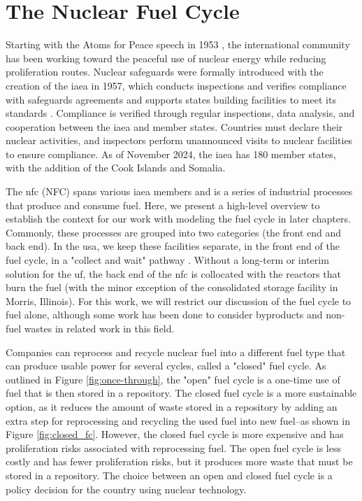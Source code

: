 \section{The Nuclear Fuel Cycle}
\label{sec:nfc}

Starting with the Atoms for Peace speech in 1953 \cite{atoms_for_peace}, the
international community has been working toward the peaceful use of nuclear
energy while reducing proliferation routes. Nuclear safeguards were formally
introduced with the creation of the \gls{iaea} in 1957, which conducts
inspections and verifies compliance with safeguards agreements and supports
states building facilities to meet its standards \cite{member_states}.
Compliance is verified through regular inspections, data analysis, and
cooperation between the \gls{iaea} and member states. Countries must
declare their nuclear activities, and inspectors perform unannounced visits to
nuclear facilities to ensure compliance. As of November 2024, the \gls{iaea}
has 180 member states, with the addition of the Cook Islands and Somalia.

The \acrlong{nfc} (NFC) spans various \gls{iaea} members and is a series of industrial processes that produce and consume fuel. Here, we present a high-level overview to establish the context for our
work with modeling the fuel cycle in later chapters. Commonly, these processes
are grouped into two categories (the front end and back end). In the \gls{usa},
we keep these facilities separate, in the front end of the fuel cycle, in
a "collect and wait" pathway \cite{cycle_risks}. Without a long-term or interim
solution for the \gls{uf}, the back end of the \gls{nfc} is collocated with the
reactors that burn the fuel (with the minor exception of the consolidated
storage facility in Morris, Illinois). For this work, we will restrict our
discussion of the fuel cycle to fuel alone, although some work has been done to
consider byproducts and non-fuel wastes in related work in this field.

Companies can reprocess and recycle nuclear fuel into a different fuel type
that can produce usable power for several cycles, called a "closed" fuel cycle.
As outlined in Figure \ref{fig:once-through}, the "open" fuel cycle is a
one-time use of fuel that is then stored in a repository. The closed fuel cycle
is a more sustainable option, as it reduces the amount of waste stored in a
repository by adding an extra step for reprocessing and recycling the used fuel
into new fuel--as shown in Figure \ref{fig:closed_fc}. However, the closed fuel
cycle is more expensive and has proliferation risks associated with reprocessing fuel. The open fuel cycle is less costly and has fewer
proliferation risks, but it produces more waste that must be stored in a
repository. The choice between an open and closed fuel cycle is a policy decision for the country using nuclear technology.

